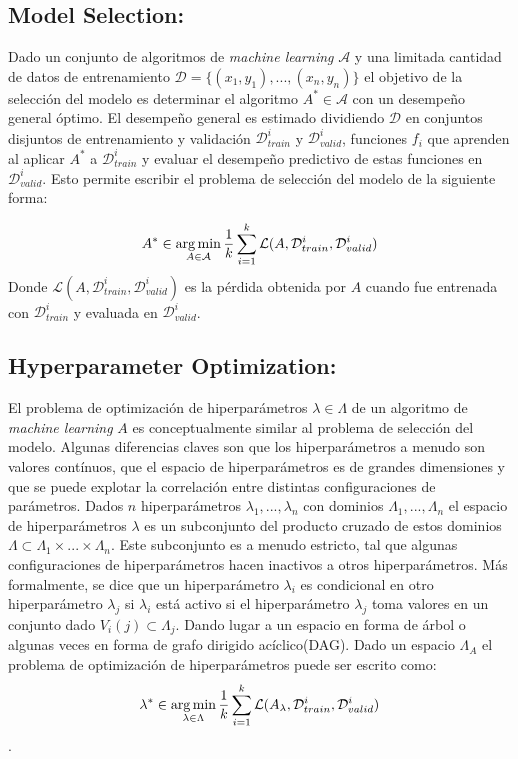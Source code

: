 \subsection{Model Selection:}
Dado un conjunto de algoritmos de \textit{machine learning} $\mathcal{A}$ y una limitada cantidad de datos de entrenamiento $\mathcal{D} = \{(x_1, y_1), ..., (x_n, y_n)\}$ el objetivo de la selección del modelo es determinar el algoritmo $A^* \in \mathcal{A}$ con un desempeño general óptimo. El desempeño general es estimado dividiendo $\mathcal{D}$ en conjuntos disjuntos de entrenamiento y validación $\mathcal{D}^{i}_{train}$ y $\mathcal{D}^{i}_{valid}$, funciones $f_i$ que aprenden al aplicar $A^*$ a $\mathcal{D}^{i}_{train}$ y evaluar el desempeño predictivo de estas funciones en $\mathcal{D}^{i}_{valid}$. Esto permite escribir el problema de selección del modelo de la siguiente forma:

$$A^* \in \operatorname*{arg\,min}_{A \in \mathcal{A}} \frac{1}{k} \sum^{k}_{i = 1} \mathcal{L}(A, \mathcal{D}^{i}_{train}, \mathcal{D}^{i}_{valid}) $$
Donde $\mathcal{L}(A, \mathcal{D}^{i}_{train}, \mathcal{D}^{i}_{valid})$ es la pérdida obtenida por $A$ cuando fue entrenada con $\mathcal{D}^{i}_{train}$ y evaluada en $\mathcal{D}^{i}_{valid}$.

\subsection{Hyperparameter Optimization:}
El problema de optimización de hiperparámetros $\lambda \in \Lambda$ de un algoritmo de \textit{machine learning} $A$ es conceptualmente similar al problema de selección del modelo. Algunas diferencias claves son que los hiperparámetros a menudo son valores contínuos, que el espacio de hiperparámetros es de grandes dimensiones y que se puede explotar la correlación entre distintas configuraciones de parámetros. Dados $n$ hiperparámetros $\lambda_1, ..., \lambda_{n}$ con dominios $\Lambda_1, ..., \Lambda_n$ el espacio de hiperparámetros $\lambda$ es un subconjunto del producto cruzado de estos dominios $\Lambda \subset \Lambda_1 \times ... \times \Lambda_n$. Este subconjunto es a menudo estricto, tal que algunas configuraciones de hiperparámetros hacen inactivos a otros hiperparámetros. Más formalmente, se dice que un hiperparámetro $\lambda_i$ es condicional en otro hiperparámetro $\lambda_j$ si $\lambda_i$ está activo si el hiperparámetro $\lambda_j$ toma valores en un conjunto dado $V_i(j) \subset \Lambda_j$. Dando lugar a un espacio en forma de árbol o algunas veces en forma de grafo dirigido acíclico(DAG). Dado un espacio $\Lambda_{A}$ el problema de optimización de hiperparámetros puede ser escrito como:
$$\lambda^* \in \operatorname*{arg\,min}_{\lambda \in \Lambda} \frac{1}{k} \sum^{k}_{i = 1} \mathcal{L}(A_{\lambda}, \mathcal{D}^{i}_{train}, \mathcal{D}^{i}_{valid}) $$.

